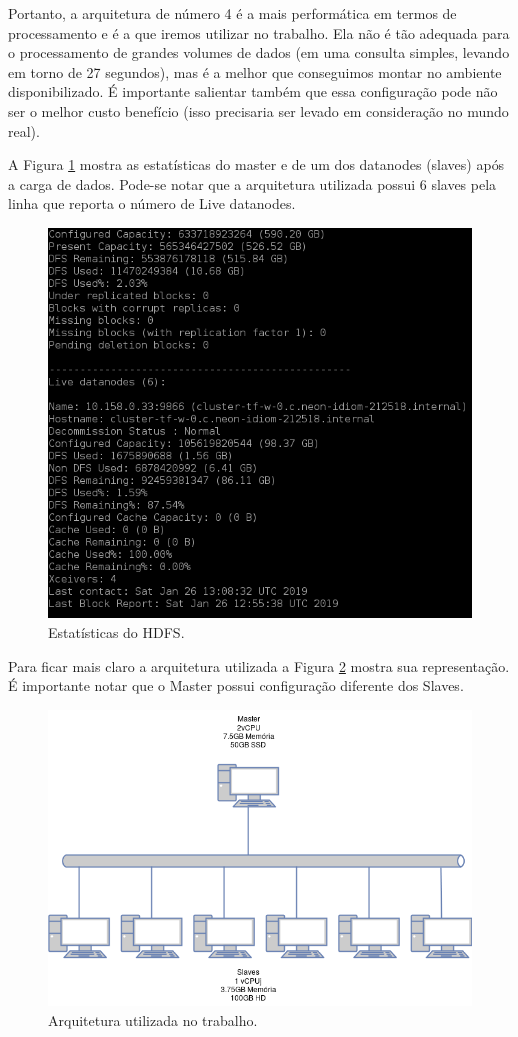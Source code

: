 \documentclass{article}
\begin{document}
Portanto, a arquitetura de número 4 é a mais performática em termos de processamento e é a que iremos utilizar no trabalho. Ela não é tão adequada para o processamento de grandes volumes de dados (em uma consulta simples, levando em torno de 27 segundos), mas é a melhor que conseguimos montar no ambiente disponibilizado. É importante salientar também que essa configuração pode não ser o melhor custo benefício (isso precisaria ser levado em consideração no mundo real).

A Figura \ref{fig:hdfs_data} mostra as estatísticas do master e de um dos datanodes (slaves) após a carga de dados. Pode-se notar que a arquitetura utilizada possui 6 slaves pela linha que reporta o número de Live datanodes.

\begin{figure}[H]
\centering
  \includegraphics[width=0.6 \linewidth]{img/hdfs-occupation.png}
  \caption{Estatísticas do HDFS.}
  \label{fig:hdfs_data}
\end{figure}

Para ficar mais claro a arquitetura utilizada a Figura \ref{fig:arch} mostra sua representação. É importante notar que o Master possui configuração diferente dos Slaves.

\begin{figure}[H]
\centering
  \includegraphics[width=0.8 \linewidth]{img/arch.png}
  \caption{Arquitetura utilizada no trabalho.}
  \label{fig:arch}
\end{figure}
\end{document}
